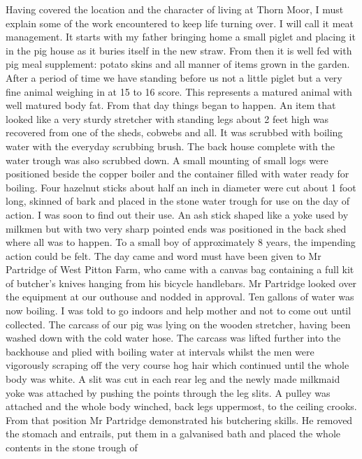 
Having covered the location and the character of living at Thorn Moor, I must
explain some of the work encountered to keep life turning over. I will call it
meat management. It starts with my father bringing home a small piglet and
placing it in the pig house as it buries itself in the new straw. From then it
is well fed with pig meal supplement: potato skins and all manner of items
grown in the garden. After a period of time we have standing before us not a
little piglet but a very fine animal weighing in at 15 to 16 score. This
represents a matured animal with well matured body fat. From that day things
began to happen. An item that looked like a very sturdy stretcher with standing
legs about 2 feet high was recovered from one of the sheds, cobwebs and all. It
was scrubbed with boiling water with the everyday scrubbing brush. The back
house complete with the water trough was also scrubbed down. A small mounting
of small logs were positioned beside the copper boiler and the container filled
with water ready for boiling. Four hazelnut sticks about half an inch in
diameter were cut about 1 foot long, skinned of bark and placed in the stone
water trough for use on the day of action. I was soon to find out their use. An
ash stick shaped like a yoke used by milkmen but with two very sharp pointed
ends was positioned in the back shed where all was to happen. To a small boy of
approximately 8 years, the impending action could be felt. The day came and
word must have been given to Mr Partridge of West Pitton Farm, who came with a
canvas bag containing a full kit of butcher's knives hanging from his bicycle
handlebars. Mr Partridge looked over the equipment at our outhouse and nodded
in approval. Ten gallons of water was now boiling. I was told to go indoors and
help mother and not to come out until collected. The carcass of our pig was
lying on the wooden stretcher, having been washed down with the cold water
hose. The carcass was lifted further into the backhouse and plied with boiling
water at intervals whilst the men were vigorously scraping off the very course
hog hair which continued until the whole body was white. A slit was cut in each
rear leg and the newly made milkmaid yoke was attached by pushing the points
through the leg slits. A pulley was attached and the whole body winched, back
legs uppermost, to the ceiling crooks. From that position Mr Partridge
demonstrated his butchering skills. He removed the stomach and entrails, put
them in a galvanised bath and placed the whole contents in the stone trough of
